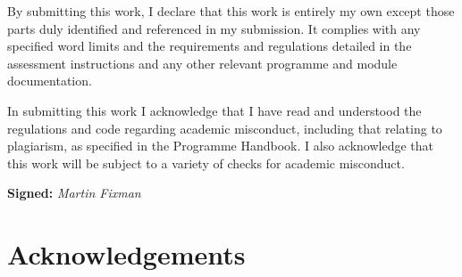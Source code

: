 \documentclass[a4paper,11pt]{article}
\begin{document}
By submitting this work, I declare that this work is entirely my own except those parts duly identified and referenced in my submission.
It complies with any specified word limits and the requirements and regulations detailed in the assessment instructions and any other relevant programme and module documentation.

In submitting this work I acknowledge that I have read and understood the regulations and code regarding academic misconduct, including that relating to plagiarism, as specified in the Programme Handbook.
I also acknowledge that this work will be subject to a variety of checks for academic misconduct.

\textbf{Signed:} \textsl{Martin Fixman}

\section*{Acknowledgements}

\clearpage{}


\clearpage{}
\tableofcontents{}

\clearpage{}


\clearpage{}


\clearpage{}


% 

\clearpage{}


% 

\clearpage{}


\clearpage{}


\clearpage{}


\clearpage{}
\begin{small}
	
\end{small}

\clearpage{}

\appendixpage{}
\appendix{}



\clearpage{}





\clearpage{}

\end{document}
